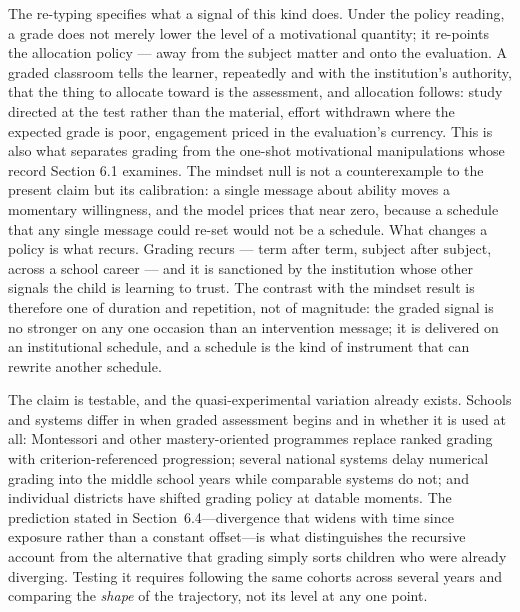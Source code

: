 \documentclass[12pt,a4paper]{article}
\begin{document}
The re-typing specifies what a signal of this kind does. Under the policy reading, a grade does not merely lower the level of a motivational quantity; it re-points the allocation policy ---\hspace{0pt} away from the subject matter and onto the evaluation. A graded classroom tells the learner, repeatedly and with the institution's authority, that the thing to allocate toward is the assessment, and allocation follows: study directed at the test rather than the material, effort withdrawn where the expected grade is poor, engagement priced in the evaluation's currency. This is also what separates grading from the one-shot motivational manipulations whose record Section 6.1 examines. The mindset null \citep{MacnamaraBurgoyne2023} is not a counterexample to the present claim but its calibration: a single message about ability moves a momentary willingness, and the model prices that near zero, because a schedule that any single message could re-set would not be a schedule. What changes a policy is what recurs. Grading recurs ---\hspace{0pt} term after term, subject after subject, across a school career ---\hspace{0pt} and it is sanctioned by the institution whose other signals the child is learning to trust. The contrast with the mindset result is therefore one of duration and repetition, not of magnitude: the graded signal is no stronger on any one occasion than an intervention message; it is delivered on an institutional schedule, and a schedule is the kind of instrument that can rewrite another schedule.

The claim is testable, and the quasi-experimental variation already exists. Schools and systems differ in when graded assessment begins and in whether it is used at all: Montessori and other mastery-oriented programmes replace ranked grading with criterion-referenced progression; several national systems delay numerical grading into the middle school years while comparable systems do not; and individual districts have shifted grading policy at datable moments. The prediction stated in Section~6.4---\hspace{0pt}divergence that widens with time since exposure rather than a constant offset---\hspace{0pt}is what distinguishes the recursive account from the alternative that grading simply sorts children who were already diverging. Testing it requires following the same cohorts across several years and comparing the \emph{shape} of the trajectory, not its level at any one point.
\end{document}
